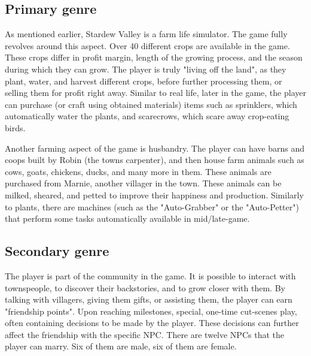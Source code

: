 \documentclass[a4paper,10pt,english]{article}
\begin{document}

\subsection*{Primary genre}

As mentioned earlier, Stardew Valley is a farm life simulator. The game fully revolves around this aspect. Over 40 different crops are available in the game. These crops differ in profit margin, length of the growing process, and the season during which they can grow. The player is truly "living off the land", as they plant, water, and harvest different crops, before further processing them, or selling them for profit right away. Similar to real life, later in the game, the player can purchase (or craft using obtained materials) items such as sprinklers, which automatically water the plants, and scarecrows, which scare away crop-eating birds.


Another farming aspect of the game is husbandry. The player can have barns and coops built by Robin (the towns carpenter), and then house farm animals such as cows, goats, chickens, ducks, and many more in them. These animals are purchased from Marnie, another villager in the town. These animals can be milked, sheared, and petted to improve their happiness and production. Similarly to plants, there are machines (such as the "Auto-Grabber" or the "Auto-Petter") that perform some tasks automatically available in mid/late-game.

\subsection*{Secondary genre}

The player is part of the community in the game. It is possible to interact with townspeople, to discover their backstories, and to grow closer with them. By talking with villagers, giving them gifts, or assisting them, the player can earn "friendship points". Upon reaching milestones, special, one-time cut-scenes play, often containing decisions to be made by the player. These decisions can further affect the friendship with the specific NPC. There are twelve NPCs that the player can marry. Six of them are male, six of them are female.
\end{document}
